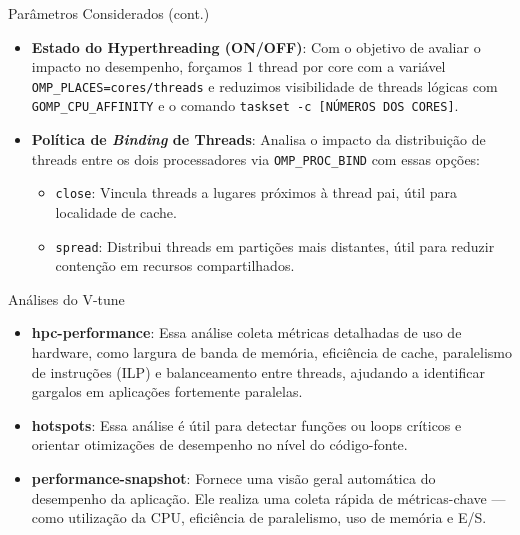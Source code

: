 \documentclass{beamer}
\begin{document}
\begin{frame}{Parâmetros Considerados (cont.)}
    \begin{itemize}
        \item \textbf{Estado do Hyperthreading (ON/OFF)}: Com o objetivo de avaliar o impacto no desempenho, forçamos 1 thread por core com a variável \texttt{OMP\_PLACES=cores/threads} e reduzimos visibilidade de threads lógicas com \texttt{GOMP\_CPU\_AFFINITY} e o comando \texttt{taskset -c [NÚMEROS DOS CORES]}.
        \item \textbf{Política de \textit{Binding} de Threads}: Analisa o impacto da distribuição de threads entre os dois processadores via \texttt{OMP\_PROC\_BIND} com essas opções:
        \begin{itemize}
            \item \texttt{close}: Vincula threads a lugares próximos à thread pai, útil para localidade de cache.
            \item \texttt{spread}: Distribui threads em partições mais distantes, útil para reduzir contenção em recursos compartilhados.
        \end{itemize}
    \end{itemize}
\end{frame}

\begin{frame}{Análises do V-tune}
    \begin{itemize}
    \item \textbf{hpc-performance}: Essa análise coleta métricas detalhadas de uso de hardware, como largura de banda de memória, eficiência de cache, paralelismo de instruções (ILP) e balanceamento entre threads, ajudando a identificar gargalos em aplicações fortemente paralelas.
    
    \item \textbf{hotspots}: Essa análise é útil para detectar funções ou loops críticos e orientar otimizações de desempenho no nível do código-fonte.
    
    \item \textbf{performance-snapshot}: Fornece uma visão geral automática do desempenho da aplicação. Ele realiza uma coleta rápida de métricas-chave — como utilização da CPU, eficiência de paralelismo, uso de memória e E/S.
    \end{itemize}
\end{frame}
\end{document}
